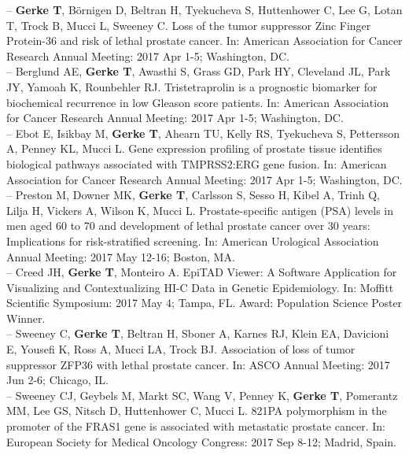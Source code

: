 \documentclass[11pt, a4paper]{article} %
\begin{document}
-- {\bf Gerke T},  B\"{o}rnigen D, Beltran H, Tyekucheva S, Huttenhower C, Lee G, Lotan T, Trock B, Mucci L, Sweeney C. Loss of the tumor suppressor Zinc Finger Protein-36 and risk of lethal prostate cancer. In: American Association for Cancer Research Annual Meeting: 2017 Apr 1-5; Washington, DC.\\

-- Berglund AE, {\bf Gerke T}, Awasthi S, Grass GD, Park HY, Cleveland JL, Park JY, Yamoah K, Rounbehler RJ. Tristetraprolin is a prognostic biomarker for biochemical recurrence in low Gleason score patients. In: American Association for Cancer Research Annual Meeting: 2017 Apr 1-5; Washington, DC.\\

-- Ebot E, Isikbay M, {\bf Gerke T}, Ahearn TU, Kelly RS, Tyekucheva S, Pettersson A, Penney KL, Mucci L. Gene expression profiling of prostate tissue identifies biological pathways associated with TMPRSS2:ERG gene fusion. In: American Association for Cancer Research Annual Meeting: 2017 Apr 1-5; Washington, DC.\\

-- Preston M, Downer MK, {\bf Gerke T}, Carlsson S, Sesso H, Kibel A, Trinh Q, Lilja H, Vickers A, Wilson K, Mucci L. Prostate-specific antigen (PSA) levels in men aged 60 to 70 and development of lethal prostate cancer over 30 years: Implications for risk-stratified screening. In: American Urological Association Annual Meeting: 2017 May 12-16; Boston, MA.\\

-- Creed JH, {\bf Gerke T}, Monteiro A. EpiTAD Viewer: A Software Application for Visualizing and Contextualizing HI-C Data in Genetic Epidemiology. In: Moffitt Scientific Symposium: 2017 May 4; Tampa, FL. Award: Population Science Poster Winner.\\

-- Sweeney C, {\bf Gerke T}, Beltran H, Sboner A, Karnes RJ, Klein EA, Davicioni E, Yousefi K, Ross A, Mucci LA, Trock BJ. Association of loss of tumor suppressor ZFP36 with lethal prostate cancer. In: ASCO Annual Meeting: 2017 Jun 2-6; Chicago, IL.\\

-- Sweeney CJ, Geybels M, Markt SC, Wang V, Penney K, {\bf Gerke T}, Pomerantz MM, Lee GS, Nitsch D, Huttenhower C, Mucci L. 821PA polymorphism in the promoter of the FRAS1 gene is associated with metastatic prostate cancer. In: European Society for Medical Oncology Congress: 2017 Sep 8-12; Madrid, Spain.\\
\end{document}

